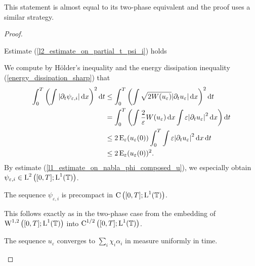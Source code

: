 \begin{remark}
	This statement is almost equal to its two-phase equivalent 
	 and the proof uses a similar strategy.
\end{remark}

\begin{proof}
	\begin{description}[wide=0pt]
		\item[Step 1:] Estimate (\ref{l2_estimate_on_partial_t_psi_i}) holds
		
		We compute by Hölder's inequality and the energy dissipation inequality 
		(\ref{energy_dissipation_sharp}) that
		\begin{align*}
			\int_{ 0 }^{ T }
				\left(
					\int
						\abs{ \partial_{ t } \psi_{ \varepsilon , i } }
					\dd{ x }
				\right)^{ 2 }
			\dd{ t }
			& \leq
			\int_{ 0 }^{ T }
				\left(
					\int
						\sqrt{ 2 W ( u_{ \varepsilon } ) }
						\abs{ \partial_{ t } u_{ \varepsilon } }
					\dd{ x }
				\right)^{ 2 }
			\dd{ t }
			\\
			& =
			\int_{ 0 }^{ T }
				\left(
				\int
					\frac{ 2 }{ \varepsilon }
					W ( u_{ \varepsilon } )
				\dd{ x }
				\int
					\varepsilon 
					\abs{ \partial_{ t } u_{ \varepsilon } }^{ 2 }
				\dd{ x }
				\right)
			\dd{ t }
			\\
			& \leq
			2 \operatorname{E}_{ \varepsilon } ( u_{ \varepsilon } ( 0 ) )
			\int_{ 0 }^{ T }
				\int
					\varepsilon 
					\abs{ \partial_{ t } u_{ \varepsilon } }^{ 2 }
				\dd{ x }
			\dd{ t }
			\\
			& \leq
			2 \operatorname{E}_{ \varepsilon } ( u_{ \varepsilon } ( 0 ) )^{ 2 }.
		\end{align*}
		By estimate (\ref{l1_estimate_on_nabla_phi_composed_u}), we especially 
		obtain $ \psi_{ \varepsilon , i } \in \operatorname{L}^{ 2 } \left( [ 0 , T ] ; 
		\operatorname{L}^{ 1 } ( \operatorname{\mathbb{T}} ) \right) $.
		
		\item[Step 2:] The sequence $ \psi_{ \varepsilon, i } $ is precompact 
		in $ \operatorname{C} \left( [ 0 , T ] ; \operatorname{L}^{ 1 } ( \operatorname{\mathbb{T}} ) \right) $.
		
		This follows exactly as in the two-phase case from the embedding of 
		$ \operatorname{W}^{ 1 , 2 } \left( [ 0 , T ] ; \operatorname{L}^{ 1 } ( \operatorname{\mathbb{T}} ) \right) $
		into $ \operatorname{C}^{ 1/2 } \left( [ 0 , T ] ; \operatorname{L}^{ 1 } ( \operatorname{\mathbb{T}} ) \right) $.
		
		\item[Step 3:] The sequence $ u_{ \varepsilon } $ converges to $ \sum_{ 
		i } \chi_{ i } \alpha_{ i } $ in measure uniformly in time.
		

\end{description}
\end{proof}
